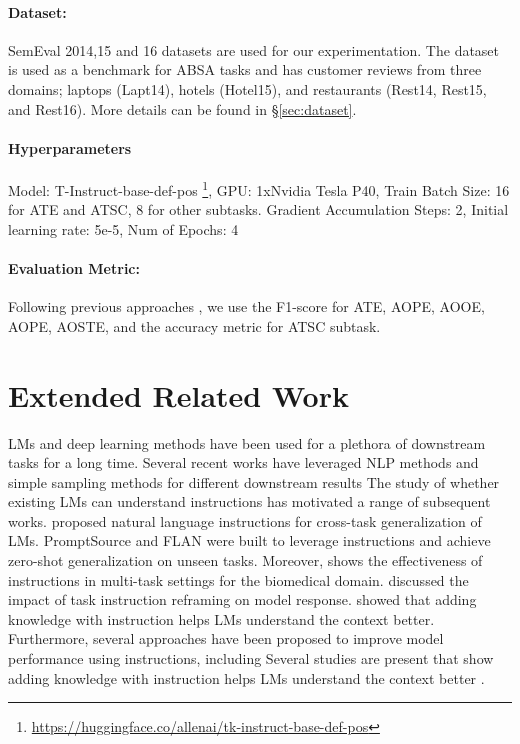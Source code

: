 \documentclass[11pt]{article}
\begin{document}
\paragraph{Dataset:} SemEval 2014,15 and 16 datasets are used for our experimentation. 
The dataset is used as a benchmark for ABSA tasks and has customer reviews from three domains; laptops (Lapt14), hotels (Hotel15), and restaurants (Rest14, Rest15, and Rest16).
More details can be found in \S \ref{sec:dataset}. 

\paragraph{Hyperparameters} 
Model: T-Instruct-base-def-pos \footnote{\url{https://huggingface.co/allenai/tk-instruct-base-def-pos}},
GPU: 1xNvidia Tesla P40,
Train Batch Size: 16 for ATE and ATSC, 8 for other subtasks.
Gradient Accumulation Steps: 2,
Initial learning rate: 5e-5,
Num of Epochs: 4

\paragraph{Evaluation Metric:} Following previous approaches \cite{zhang-etal-2021-towards-generative, luo-etal-2020-grace}, we use the F1-score for ATE, AOPE, AOOE, AOPE, AOSTE, and the accuracy metric for ATSC subtask. 


\section{Extended Related Work}

LMs and deep learning methods have been used for a plethora of downstream tasks for a long time.
Several recent works have leveraged NLP methods and simple sampling methods for different downstream results 
The study of whether existing LMs can understand instructions has motivated a range of subsequent works. 
\citet{mishra-etal-2022-cross} proposed natural language instructions for cross-task generalization of LMs. 
PromptSource and FLAN \cite{wei2022finetuned} were built to leverage instructions and achieve zero-shot generalization on unseen tasks. 
Moreover, \citet{parmar-etal-2022-boxbart} shows the effectiveness of instructions in multi-task settings for the biomedical domain. 
\citet{mishra-etal-2022-reframing} discussed the impact of task instruction reframing on model response.
\citet{gupta2022john} showed that adding knowledge with instruction helps LMs understand the context better.
Furthermore, several approaches have been proposed to improve model performance using instructions, including \cite{wang-etal-2022-super, luo2022biotabqa, mishra2022help} 
Several studies are present that show adding knowledge with instruction helps LMs understand the context better \cite{gupta2021context}. 
\end{document}
